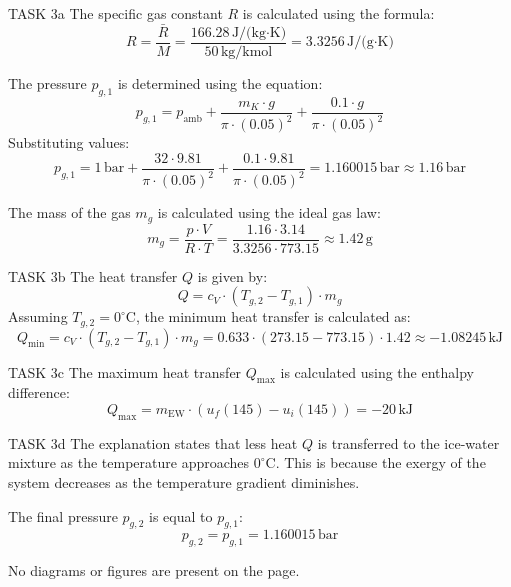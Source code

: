 TASK 3a  
The specific gas constant \( R \) is calculated using the formula:  
\[
R = \frac{\bar{R}}{M} = \frac{166.28 \, \text{J/(kg·K)}}{50 \, \text{kg/kmol}} = 3.3256 \, \text{J/(g·K)}
\]  

The pressure \( p_{g,1} \) is determined using the equation:  
\[
p_{g,1} = p_{\text{amb}} + \frac{m_K \cdot g}{\pi \cdot (0.05)^2} + \frac{0.1 \cdot g}{\pi \cdot (0.05)^2}
\]  
Substituting values:  
\[
p_{g,1} = 1 \, \text{bar} + \frac{32 \cdot 9.81}{\pi \cdot (0.05)^2} + \frac{0.1 \cdot 9.81}{\pi \cdot (0.05)^2} = 1.160015 \, \text{bar} \approx 1.16 \, \text{bar}
\]  

The mass of the gas \( m_g \) is calculated using the ideal gas law:  
\[
m_g = \frac{p \cdot V}{R \cdot T} = \frac{1.16 \cdot 3.14}{3.3256 \cdot 773.15} \approx 1.42 \, \text{g}
\]  

TASK 3b  
The heat transfer \( Q \) is given by:  
\[
Q = c_V \cdot (T_{g,2} - T_{g,1}) \cdot m_g
\]  
Assuming \( T_{g,2} = 0^\circ\text{C} \), the minimum heat transfer is calculated as:  
\[
Q_{\text{min}} = c_V \cdot (T_{g,2} - T_{g,1}) \cdot m_g = 0.633 \cdot (273.15 - 773.15) \cdot 1.42 \approx -1.08245 \, \text{kJ}
\]  

TASK 3c  
The maximum heat transfer \( Q_{\text{max}} \) is calculated using the enthalpy difference:  
\[
Q_{\text{max}} = m_{\text{EW}} \cdot (u_f(145) - u_i(145)) = -20 \, \text{kJ}
\]  

TASK 3d  
The explanation states that less heat \( Q \) is transferred to the ice-water mixture as the temperature approaches \( 0^\circ\text{C} \). This is because the exergy of the system decreases as the temperature gradient diminishes.  

The final pressure \( p_{g,2} \) is equal to \( p_{g,1} \):  
\[
p_{g,2} = p_{g,1} = 1.160015 \, \text{bar}
\]  

No diagrams or figures are present on the page.